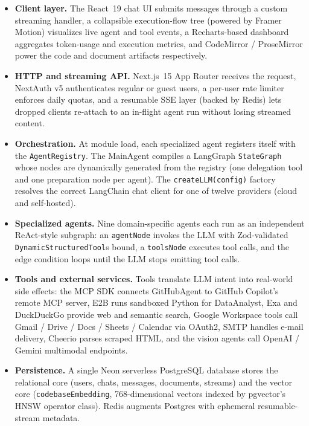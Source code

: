 \documentclass[11pt,a4paper]{report}
\newcommand{\code}[1]{\texttt{\small #1}}
\begin{document}
\begin{itemize}
  \item \textbf{Client layer.} The React~19 chat UI submits messages through a
    custom streaming handler, a collapsible execution-flow tree (powered by
    Framer Motion) visualizes live agent and tool events, a Recharts-based
    dashboard aggregates token-usage and execution metrics, and CodeMirror /
    ProseMirror power the code and document artifacts respectively.

  \item \textbf{HTTP and streaming API.} Next.js~15 App Router receives the
    request, NextAuth v5 authenticates regular or guest users, a per-user
    rate limiter enforces daily quotas, and a resumable SSE layer (backed by
    Redis) lets dropped clients re-attach to an in-flight agent run without
    losing streamed content.

  \item \textbf{Orchestration.} At module load, each specialized agent
    registers itself with the \code{AgentRegistry}. The MainAgent compiles a
    LangGraph \code{StateGraph} whose nodes are dynamically generated from
    the registry (one delegation tool and one preparation node per agent).
    The \code{createLLM(config)} factory resolves the correct LangChain chat
    client for one of twelve providers (cloud and self-hosted).

  \item \textbf{Specialized agents.} Nine domain-specific agents each run as
    an independent ReAct-style subgraph: an \code{agentNode} invokes the LLM
    with Zod-validated \code{DynamicStructuredTool}s bound, a \code{toolsNode}
    executes tool calls, and the edge condition loops until the LLM stops
    emitting tool calls.

  \item \textbf{Tools and external services.} Tools translate LLM intent into
    real-world side effects: the MCP SDK connects GitHubAgent to GitHub
    Copilot's remote MCP server, E2B runs sandboxed Python for DataAnalyst,
    Exa and DuckDuckGo provide web and semantic search, Google Workspace
    tools call Gmail / Drive / Docs / Sheets / Calendar via OAuth2, SMTP
    handles e-mail delivery, Cheerio parses scraped HTML, and the vision
    agents call OpenAI / Gemini multimodal endpoints.

  \item \textbf{Persistence.} A single Neon serverless PostgreSQL database
    stores the relational core (users, chats, messages, documents, streams)
    and the vector core (\code{codebaseEmbedding}, 768-dimensional vectors
    indexed by pgvector's HNSW operator class). Redis augments Postgres with
    ephemeral resumable-stream metadata.
\end{itemize}
\end{document}
